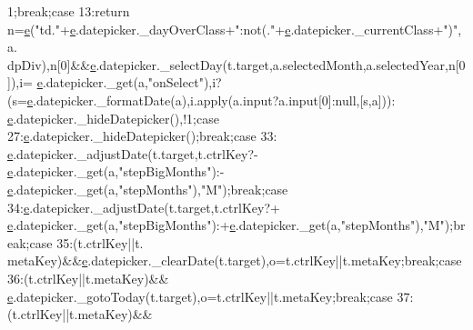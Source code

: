 \begin{DoxyCode}
      1;\textcolor{keywordflow}{break};\textcolor{keywordflow}{case} 13:\textcolor{keywordflow}{return} n=\hyperlink{jquery-ui_8min_8js_a2c038346d47955cbe2cb91e338edd7e1}{e}(\textcolor{stringliteral}{"td."}+\hyperlink{jquery-ui_8min_8js_a2c038346d47955cbe2cb91e338edd7e1}{e}.datepicker.\_dayOverClass+\textcolor{stringliteral}{":not(."}+\hyperlink{jquery-ui_8min_8js_a2c038346d47955cbe2cb91e338edd7e1}{e}.datepicker.\_currentClass+\textcolor{stringliteral}{")"},a.
      dpDiv),n[0]&&\hyperlink{jquery-ui_8min_8js_a2c038346d47955cbe2cb91e338edd7e1}{e}.datepicker.\_selectDay(t.target,a.selectedMonth,a.selectedYear,n[0]),i=
      \hyperlink{jquery-ui_8min_8js_a2c038346d47955cbe2cb91e338edd7e1}{e}.datepicker.\_get(a,\textcolor{stringliteral}{"onSelect"}),i?(s=\hyperlink{jquery-ui_8min_8js_a2c038346d47955cbe2cb91e338edd7e1}{e}.datepicker.\_formatDate(a),i.apply(a.input?a.input[0]:null,[s,a])):
      \hyperlink{jquery-ui_8min_8js_a2c038346d47955cbe2cb91e338edd7e1}{e}.datepicker.\_hideDatepicker(),!1;\textcolor{keywordflow}{case} 27:\hyperlink{jquery-ui_8min_8js_a2c038346d47955cbe2cb91e338edd7e1}{e}.datepicker.\_hideDatepicker();\textcolor{keywordflow}{break};\textcolor{keywordflow}{case} 33:
      \hyperlink{jquery-ui_8min_8js_a2c038346d47955cbe2cb91e338edd7e1}{e}.datepicker.\_adjustDate(t.target,t.ctrlKey?-\hyperlink{jquery-ui_8min_8js_a2c038346d47955cbe2cb91e338edd7e1}{e}.datepicker.\_get(a,\textcolor{stringliteral}{"stepBigMonths"}):-
      \hyperlink{jquery-ui_8min_8js_a2c038346d47955cbe2cb91e338edd7e1}{e}.datepicker.\_get(a,\textcolor{stringliteral}{"stepMonths"}),\textcolor{stringliteral}{"M"});\textcolor{keywordflow}{break};\textcolor{keywordflow}{case} 34:\hyperlink{jquery-ui_8min_8js_a2c038346d47955cbe2cb91e338edd7e1}{e}.datepicker.\_adjustDate(t.target,t.ctrlKey?+
      \hyperlink{jquery-ui_8min_8js_a2c038346d47955cbe2cb91e338edd7e1}{e}.datepicker.\_get(a,\textcolor{stringliteral}{"stepBigMonths"}):+\hyperlink{jquery-ui_8min_8js_a2c038346d47955cbe2cb91e338edd7e1}{e}.datepicker.\_get(a,\textcolor{stringliteral}{"stepMonths"}),\textcolor{stringliteral}{"M"});\textcolor{keywordflow}{break};\textcolor{keywordflow}{case} 35:(t.ctrlKey||t.
      metaKey)&&\hyperlink{jquery-ui_8min_8js_a2c038346d47955cbe2cb91e338edd7e1}{e}.datepicker.\_clearDate(t.target),o=t.ctrlKey||t.metaKey;\textcolor{keywordflow}{break};\textcolor{keywordflow}{case} 36:(t.ctrlKey||t.metaKey)&&
      \hyperlink{jquery-ui_8min_8js_a2c038346d47955cbe2cb91e338edd7e1}{e}.datepicker.\_gotoToday(t.target),o=t.ctrlKey||t.metaKey;\textcolor{keywordflow}{break};\textcolor{keywordflow}{case} 37:(t.ctrlKey||t.metaKey)&&

\end{DoxyCode}
